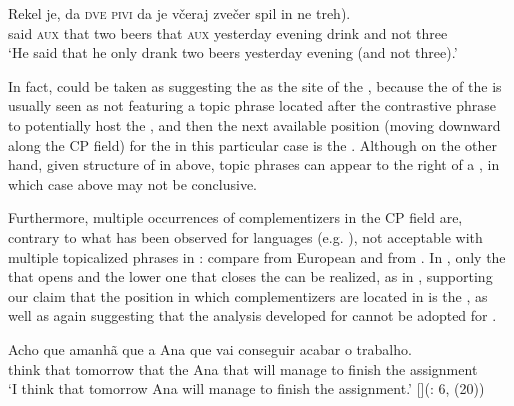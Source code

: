 \documentclass[output=paper,colorlinks,citecolor=brown]{langsci/langscibook}
\begin{document}
\begin{exe}
\ex \label{ex:plesnicar:38}
\gll Rekel je,	da	\textsc{dve}	\textsc{pivi} da	je včeraj zvečer spil \minsp{(} in	ne	treh).\\
  said	\textsc{aux} that two beers	that \textsc{aux} yesterday evening drink {} and not three\\
\trans `He said that he only drank two beers yesterday evening (and not three).'
\end{exe}

\noindent In fact,  could be taken as suggesting the  as the site of the  , because the  of the  is usually seen as not featuring a topic phrase located after the contrastive  phrase to potentially host the   \citep{rizzi1997}, and then the next available position (moving downward along the CP field) for the   in this particular case is the . Although on the other hand, given  structure of   in  above,  topic phrases can appear to the right of a , in which case  above may not be conclusive.

Furthermore, multiple occurrences of complementizers in the CP field are, contrary to what has been observed for  languages (e.g. \citealt{ledgeway2005, mascarenhas2007, villa2012}), not acceptable with multiple topicalized phrases in : compare  from European   and  from . In , only the  that opens and the lower one that closes the  can be realized, as in , supporting our claim that the position in which  complementizers are located in  is the , as well as again suggesting that the analysis developed for  cannot be adopted for .

\begin{exe}
\ex \label{ex:plesnicar:41}
\gll Acho 	que 	amanh{ã} 	que 	a 	Ana 	que 	vai 	conseguir acabar 	o 	trabalho.  \\
  think 	that 	tomorrow 	that 	the 	Ana 	that 	will 	manage {to finish} 	the 	assignment\\
\trans `I think that tomorrow Ana will manage to finish the assignment.'
\exi{}[]{\hfill(\citealt{mascarenhas2007}: 6, (20))}
\end{exe}
\end{document}
